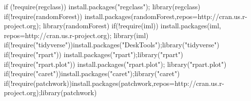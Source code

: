 \documentclass[
]{article}
\newenvironment{Shaded}{\begin{snugshade}}{\end{snugshade}}
\newcommand{\AttributeTok}[1]{\textcolor[rgb]{0.80,0.80,0.80}{#1}}
\newcommand{\ControlFlowTok}[1]{\textcolor[rgb]{0.94,0.87,0.69}{#1}}
\newcommand{\FunctionTok}[1]{\textcolor[rgb]{0.94,0.94,0.56}{#1}}
\newcommand{\NormalTok}[1]{\textcolor[rgb]{0.80,0.80,0.80}{#1}}
\newcommand{\SpecialCharTok}[1]{\textcolor[rgb]{0.86,0.64,0.64}{#1}}
\newcommand{\StringTok}[1]{\textcolor[rgb]{0.80,0.58,0.58}{#1}}
\begin{document}
\begin{Shaded}
\begin{Highlighting}[]
\ControlFlowTok{if}\NormalTok{ (}\SpecialCharTok{!}\FunctionTok{require}\NormalTok{(}\StringTok{\textquotesingle{}regclass\textquotesingle{}}\NormalTok{)) }\FunctionTok{install.packages}\NormalTok{(}\StringTok{"regclass"}\NormalTok{); }\FunctionTok{library}\NormalTok{(regclass)}
\ControlFlowTok{if}\NormalTok{(}\SpecialCharTok{!}\FunctionTok{require}\NormalTok{(}\StringTok{\textquotesingle{}randomForest\textquotesingle{}}\NormalTok{)) }\FunctionTok{install.packages}\NormalTok{(}\StringTok{\textquotesingle{}randomForest\textquotesingle{}}\NormalTok{,}\AttributeTok{repos=}\StringTok{\textquotesingle{}http://cran.us.r{-}project.org\textquotesingle{}}\NormalTok{); }\FunctionTok{library}\NormalTok{(randomForest)}
\ControlFlowTok{if}\NormalTok{(}\SpecialCharTok{!}\FunctionTok{require}\NormalTok{(}\StringTok{\textquotesingle{}iml\textquotesingle{}}\NormalTok{)) }\FunctionTok{install.packages}\NormalTok{(}\StringTok{\textquotesingle{}iml\textquotesingle{}}\NormalTok{, }\AttributeTok{repos=}\StringTok{\textquotesingle{}http://cran.us.r{-}project.org\textquotesingle{}}\NormalTok{); }\FunctionTok{library}\NormalTok{(iml)}
\ControlFlowTok{if}\NormalTok{(}\SpecialCharTok{!}\FunctionTok{require}\NormalTok{(}\StringTok{"tidyverse"}\NormalTok{))}\FunctionTok{install.packages}\NormalTok{(}\StringTok{"DeskTools"}\NormalTok{);}\FunctionTok{library}\NormalTok{(}\StringTok{"tidyverse"}\NormalTok{)}
\ControlFlowTok{if}\NormalTok{(}\SpecialCharTok{!}\FunctionTok{require}\NormalTok{(}\StringTok{"rpart"}\NormalTok{)) }\FunctionTok{install.packages}\NormalTok{(}\StringTok{"rpart"}\NormalTok{);}\FunctionTok{library}\NormalTok{(}\StringTok{"rpart"}\NormalTok{)}
\ControlFlowTok{if}\NormalTok{(}\SpecialCharTok{!}\FunctionTok{require}\NormalTok{(}\StringTok{"rpart.plot"}\NormalTok{)) }\FunctionTok{install.packages}\NormalTok{(}\StringTok{"rpart.plot"}\NormalTok{); }\FunctionTok{library}\NormalTok{(}\StringTok{"rpart.plot"}\NormalTok{)}
\ControlFlowTok{if}\NormalTok{(}\SpecialCharTok{!}\FunctionTok{require}\NormalTok{(}\StringTok{"caret"}\NormalTok{))}\FunctionTok{install.packages}\NormalTok{(}\StringTok{"caret"}\NormalTok{);}\FunctionTok{library}\NormalTok{(}\StringTok{"caret"}\NormalTok{)}
\ControlFlowTok{if}\NormalTok{(}\SpecialCharTok{!}\FunctionTok{require}\NormalTok{(}\StringTok{\textquotesingle{}patchwork\textquotesingle{}}\NormalTok{))}\FunctionTok{install.packages}\NormalTok{(}\StringTok{\textquotesingle{}patchwork\textquotesingle{}}\NormalTok{,}\AttributeTok{repos=}\StringTok{\textquotesingle{}http://cran.us.r{-}project.org\textquotesingle{}}\NormalTok{);}\FunctionTok{library}\NormalTok{(patchwork)}
\end{Highlighting}
\end{Shaded}
\end{document}
